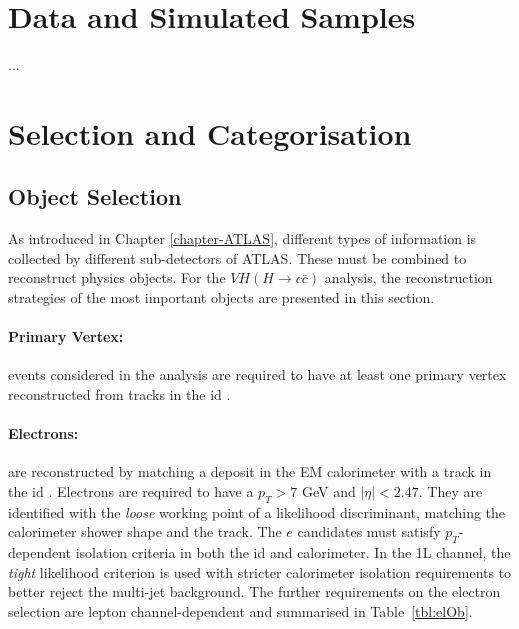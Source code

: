 \section{Data and Simulated Samples}\label{sec-datasets}
...

\section{Selection and Categorisation}\label{sec-selectionandcat}
\subsection{Object Selection}\label{sec-obj}
As introduced in Chapter \ref{chapter-ATLAS}, different types of information is collected by different sub-detectors of ATLAS. These must be combined to reconstruct physics objects. For the $VH (H\rightarrow c\bar{c})$ analysis, the reconstruction strategies of the most important objects are presented in this section. 

\paragraph{Primary Vertex:} events considered in the analysis are required to have at least one primary vertex reconstructed from tracks in the \gls{id} \cite{ATL-PHYS-PUB-2015-026}.

\paragraph{Electrons:} are reconstructed by matching a deposit in the EM calorimeter with a track in the \gls{id} \cite{Aaboud:2657964, Aad_2019}. Electrons are required to have a $p_T > 7$ GeV and $|\eta|<2.47$. They are identified with the \textit{loose} working point of a likelihood discriminant, matching the calorimeter shower shape and the track. The $e$ candidates must satisfy $p_T$-dependent isolation criteria in both the \gls{id} and calorimeter. In the 1L channel, the \textit{tight} likelihood criterion is used with stricter calorimeter isolation requirements to better reject the multi-jet background. The further requirements on the electron selection are lepton channel-dependent and summarised in Table~\ref{tbl:elOb}. %

